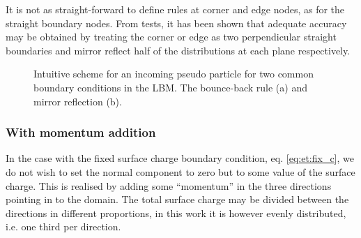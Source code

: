 It is not as straight-forward to define rules at corner and edge
nodes, as for the straight boundary nodes. From tests, it has been
shown that adequate accuracy may be obtained by treating the corner or
edge as two perpendicular straight boundaries and mirror reflect half
of the distributions at each plane respectively. 

\begin{figure}
  \centering
  \hspace{5pt} 
  \caption{Intuitive scheme for an incoming pseudo particle for two
    common boundary conditions in the LBM. The bounce-back rule (a)
    and mirror reflection (b).}
  \label{fig:lbm:bbs}
\end{figure}

\subsubsection{With momentum addition}\label{sec:lbm:mod_mirror}
In the case with the fixed surface charge boundary condition,
eq. \eqref{eq:et:fix_c}, we do not wish to set the normal component to
zero but to some value of the surface charge. This is realised by
adding some ``momentum'' in the three directions pointing in to the
domain. The total surface charge may be divided between the directions
in different proportions, in this work it is however evenly
distributed, i.e. one third per direction. 


